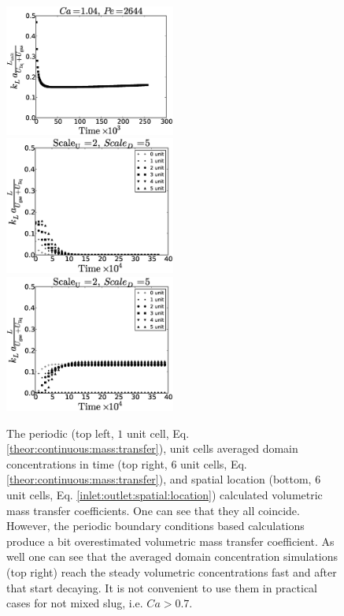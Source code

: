 \documentclass{article}
\begin{document}
\begin{figure}
\includegraphics[width=0.5\textwidth]{Figures/volume_ca_104_scaleu2scaled5.eps}
\includegraphics[width=0.5\textwidth]{Figures/aver_moving_window6scaleu2scaled5.eps}\\
\includegraphics[width=0.5\textwidth]{Figures/flux_moving_window6scaleu2scaled5.eps}\\
\caption{The periodic (top left, $1$ unit cell, Eq. \ref{theor:continuous:mass:transfer}), unit
cells averaged domain concentrations in time (top right, $6$ unit cells, Eq.
\ref{theor:continuous:mass:transfer}), and spatial location
(bottom, $6$ unit cells, Eq. \ref{inlet:outlet:spatial:location}) calculated  volumetric mass
transfer
coefficients. One can see that they all coincide. However, the periodic boundary conditions based
calculations produce a bit overestimated volumetric mass transfer
coefficient. As well one can see that the averaged domain concentration simulations (top right)
reach the steady volumetric concentrations fast and after that start decaying. It is not convenient
to use them in practical cases for not mixed slug, i.e. $Ca>0.7$. \label{fig:periodic:ca1040}}
\end{figure}
\end{document}
